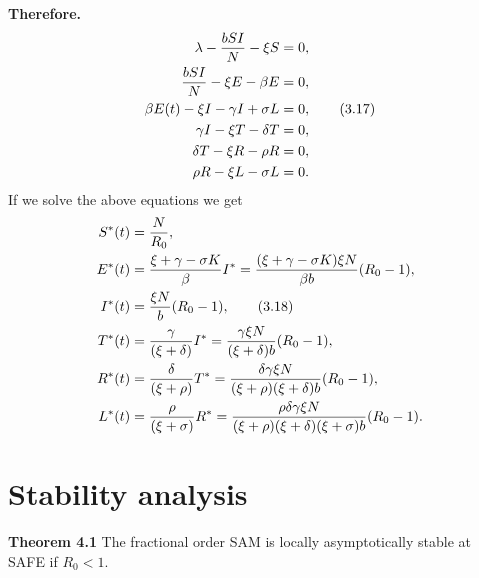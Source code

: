 \documentclass[10pt]{NSP1}
\begin{document}
	\textbf{Therefore.} 
	\begin{align}
		\lambda - \frac{b S I}{N} - \xi S &= 0, \notag \\
		\frac{b S I}{N} - \xi E - \beta E &= 0, \notag \\
		\beta E(t) - \xi I - \gamma I + \sigma L &= 0, \tag{3.17} \\
		\gamma I - \xi T - \delta T &= 0, \notag \\
		\delta T - \xi R - \rho R &= 0, \notag \\
		\rho R - \xi L - \sigma L &= 0.  \notag
	\end{align}
	If we solve the above equations we get
	\begin{align}
		S^\ast(t) &= \frac{N}{R_0}, \notag \\
		E^\ast(t) &= \frac{\xi + \gamma - \sigma K}{\beta} I^\ast = \frac{(\xi + \gamma - \sigma K)\xi N}{\beta b} (R_0 - 1), \notag \\
		I^\ast(t) &= \frac{\xi N}{b} (R_0 - 1), \tag{3.18} \\
		T^\ast(t) &= \frac{\gamma}{(\xi + \delta)} I^\ast = \frac{\gamma \xi N}{(\xi + \delta)b} (R_0 - 1), \notag \\
		R^\ast(t) &= \frac{\delta}{(\xi + \rho)} T^\ast = \frac{\delta \gamma \xi N}{(\xi + \rho)(\xi + \delta)b} (R_0 - 1), \notag \\
		L^\ast(t) &= \frac{\rho}{(\xi + \sigma)} R^\ast = \frac{\rho \delta \gamma \xi N}{(\xi + \rho)(\xi + \delta)(\xi + \sigma) b} (R_0 - 1). \notag
	\end{align}
	
	
	
	\section{\bfseries Stability analysis}
	
	\textbf{Theorem 4.1} The fractional order SAM is locally asymptotically stable at SAFE if $R_0 < 1$.
	
\end{document}
